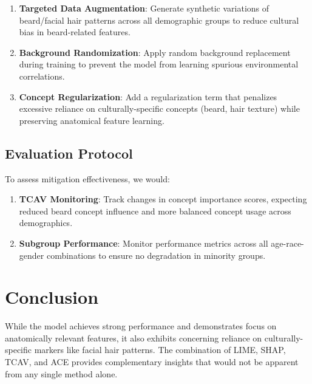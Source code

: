 \documentclass[11pt,letterpaper]{article}
\begin{document}
\begin{enumerate}
\item \textbf{Targeted Data Augmentation}: Generate synthetic variations of beard/facial hair patterns across all demographic groups to reduce cultural bias in beard-related features.

\item \textbf{Background Randomization}: Apply random background replacement during training to prevent the model from learning spurious environmental correlations.

\item \textbf{Concept Regularization}: Add a regularization term that penalizes excessive reliance on culturally-specific concepts (beard, hair texture) while preserving anatomical feature learning.
\end{enumerate}

\subsection{Evaluation Protocol}
To assess mitigation effectiveness, we would:

\begin{enumerate}
\item \textbf{TCAV Monitoring}: Track changes in concept importance scores, expecting reduced beard concept influence and more balanced concept usage across demographics.

\item \textbf{Subgroup Performance}: Monitor performance metrics across all age-race-gender combinations to ensure no degradation in minority groups.

\end{enumerate}


\section{Conclusion}

While the model achieves strong performance and demonstrates focus on anatomically relevant features, it also exhibits concerning reliance on culturally-specific markers like facial hair patterns. The combination of LIME, SHAP, TCAV, and ACE provides complementary insights that would not be apparent from any single method alone.
\end{document}
